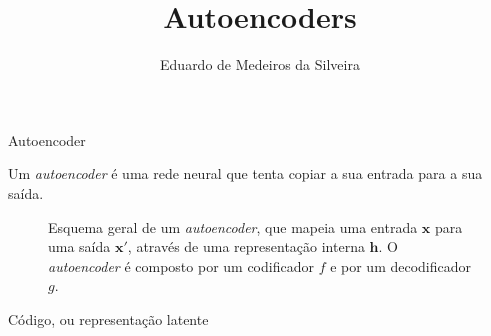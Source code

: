 \documentclass{beamer}
\title{Autoencoders}
\author{Eduardo de Medeiros da Silveira}
\institute{Universidade Federal de Santa Maria}
\date{}
\begin{document}
\frame{\titlepage}

\begin{frame}{Autoencoder}

\justifying

Um \emph{autoencoder} é uma rede neural que tenta copiar a sua entrada para a sua saída.

\begin{figure}

\centering


\caption{
\justifying
Esquema geral de um \emph{autoencoder}, que mapeia uma entrada $\boldsymbol{x}$ para uma saída $\boldsymbol{x'}$, através de uma representação interna $\boldsymbol{h}$. 
O \emph{autoencoder} é composto por um codificador $f$ e por um decodificador $g$.
}

\end{figure}

\end{frame}

\begin{frame}{Código, ou representação latente}
    
\end{frame}
\end{document}
